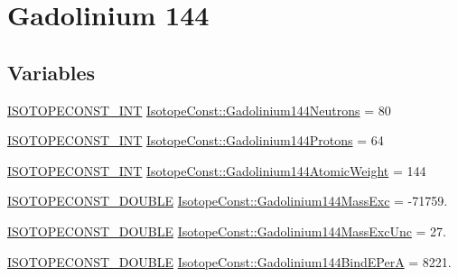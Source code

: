 \hypertarget{group___isotope_const-_gadolinium-_gd144}{}\section{Gadolinium 144}
\label{group___isotope_const-_gadolinium-_gd144}
\subsection*{Variables}
\begin{DoxyCompactItemize}
\item 
\mbox{\hyperlink{group___isotope_const-_macros_ga5f18360b3e99483a35c32d789e62621c}{I\+S\+O\+T\+O\+P\+E\+C\+O\+N\+S\+T\+\_\+\+I\+NT}} \mbox{\hyperlink{group___isotope_const-_gadolinium-_gd144_ga7f533272e14e131285dd468b190311ab}{Isotope\+Const\+::\+Gadolinium144\+Neutrons}} = 80
\item 
\mbox{\hyperlink{group___isotope_const-_macros_ga5f18360b3e99483a35c32d789e62621c}{I\+S\+O\+T\+O\+P\+E\+C\+O\+N\+S\+T\+\_\+\+I\+NT}} \mbox{\hyperlink{group___isotope_const-_gadolinium-_gd144_gaaec35b43541a41ca931fb54bec648e5e}{Isotope\+Const\+::\+Gadolinium144\+Protons}} = 64
\item 
\mbox{\hyperlink{group___isotope_const-_macros_ga5f18360b3e99483a35c32d789e62621c}{I\+S\+O\+T\+O\+P\+E\+C\+O\+N\+S\+T\+\_\+\+I\+NT}} \mbox{\hyperlink{group___isotope_const-_gadolinium-_gd144_gaa202d2f65a0baf8d6dbd605c0721fa7b}{Isotope\+Const\+::\+Gadolinium144\+Atomic\+Weight}} = 144
\item 
\mbox{\hyperlink{group___isotope_const-_macros_ga8f45a7272ce02c0b4c65c44636ed719a}{I\+S\+O\+T\+O\+P\+E\+C\+O\+N\+S\+T\+\_\+\+D\+O\+U\+B\+LE}} \mbox{\hyperlink{group___isotope_const-_gadolinium-_gd144_ga1e4dd60707753a54fe88befcecbadc98}{Isotope\+Const\+::\+Gadolinium144\+Mass\+Exc}} = -\/71759.
\item 
\mbox{\hyperlink{group___isotope_const-_macros_ga8f45a7272ce02c0b4c65c44636ed719a}{I\+S\+O\+T\+O\+P\+E\+C\+O\+N\+S\+T\+\_\+\+D\+O\+U\+B\+LE}} \mbox{\hyperlink{group___isotope_const-_gadolinium-_gd144_gad61181e246020fb2e6fa7f9d9dd88e9c}{Isotope\+Const\+::\+Gadolinium144\+Mass\+Exc\+Unc}} = 27.
\item 
\mbox{\hyperlink{group___isotope_const-_macros_ga8f45a7272ce02c0b4c65c44636ed719a}{I\+S\+O\+T\+O\+P\+E\+C\+O\+N\+S\+T\+\_\+\+D\+O\+U\+B\+LE}} \mbox{\hyperlink{group___isotope_const-_gadolinium-_gd144_ga701958f4a88e48c6efed14c2477105f2}{Isotope\+Const\+::\+Gadolinium144\+Bind\+E\+PerA}} = 8221.

\end{DoxyCompactItemize}
